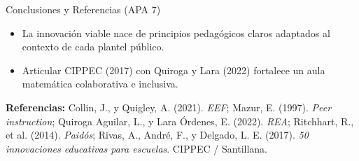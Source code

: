 \documentclass[aspectratio=169,spanish,xcolor=table]{beamer}
\begin{document}
\begin{frame}{Conclusiones y Referencias (APA 7)}
  \begin{itemize}\small
    \item La innovación viable nace de principios pedagógicos claros adaptados al contexto de cada plantel público.
    \item Articular CIPPEC (2017) con Quiroga y Lara (2022) fortalece un aula matemática colaborativa e inclusiva.
  \end{itemize}
  \vspace{0.3cm}
  \scriptsize
  \textbf{Referencias:} Collin, J., y Quigley, A. (2021). \textit{EEF}; Mazur, E. (1997). \textit{Peer instruction}; Quiroga Aguilar, L., y Lara Órdenes, E. (2022). \textit{REA}; Ritchhart, R., et al. (2014). \textit{Paidós}; Rivas, A., André, F., y Delgado, L. E. (2017). \textit{50 innovaciones educativas para escuelas}. CIPPEC / Santillana.
\end{frame}
\end{document}
